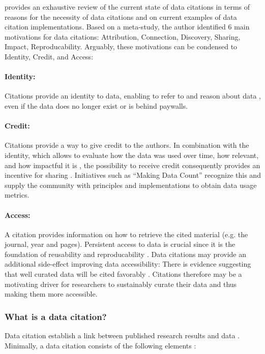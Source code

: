 \documentclass[letterpaper, parskip=half]{scrartcl}
\begin{document}
\cite{Silvello2017} provides an exhaustive review of the current state of data citations in terms of reasons for the necessity of data citations and on current examples of data citation implementations. Based on a meta-study, the author identified 6 main motivations for data citations: Attribution, Connection, Discovery, Sharing, Impact, Reproducability. 
Arguably, these motivations can be condensed to Identity, Credit, and Access: 

\paragraph{Identity:} 
Citations provide an identity to data, enabling to refer to and reason about data \citep{Bandrowski2016}, even if the data does no longer exist or is behind paywalls. 
\paragraph{Credit:}
Citations provide a way to give credit to the authors. 
In combination with the identity, which allows to evaluate how the data was used over time, how relevant, and how impactful it is \citep{Honor2016}, the possibility to receive credit consequently provides an incentive for sharing \citep{Niemeyer2016, Callaghan2012, Kratz2014}. Initiatives such as ``Making Data Count''\citep{Kratz2015} recognize this and supply the community with principles and implementations to obtain data usage metrics.

\paragraph{Access:} 
A citation provides information on how to retrieve the cited material (e.g. the journal, year and pages). Persistent access to data is crucial since it is the foundation of reusability and reproducability \citep{Starr2015}.
Data citations may provide an additional side-effect improving data accessibility: There is evidence suggesting that well curated data will be cited favorably \citep{Belter2014}. Citations therefore may be a motivating driver for researchers to sustainably curate their data and thus making them more accessible.


\subsubsection{What is a data citation?}
Data citation establish a link between published research results and data \citep{CODATA2013}. Minimally, a data citation consists of the following elements \citep{Cook2016}:
\end{document}
